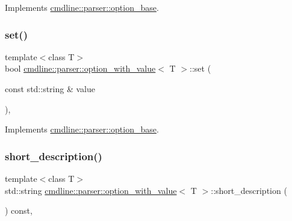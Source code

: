 Implements \mbox{\hyperlink{classcmdline_1_1parser_1_1option__base_a6729965a4221ba0112ca04f8550fce5c}{cmdline\+::parser\+::option\+\_\+base}}.

\mbox{\label{classcmdline_1_1parser_1_1option__with__value_a295815e19351f027fdbdcf00d46187d1}} 
\subsubsection{\texorpdfstring{set()}{set()}\hspace{0.1cm}{\footnotesize\ttfamily [2/2]}}
{\footnotesize\ttfamily template$<$class T$>$ \\
bool \mbox{\hyperlink{classcmdline_1_1parser_1_1option__with__value}{cmdline\+::parser\+::option\+\_\+with\+\_\+value}}$<$ T $>$\+::set (\begin{DoxyParamCaption}\item[{const std\+::string \&}]{value }\end{DoxyParamCaption})\hspace{0.3cm}{\ttfamily [inline]}, {\ttfamily [virtual]}}



Implements \mbox{\hyperlink{classcmdline_1_1parser_1_1option__base_a60444de6a257a3cca44a7a687a1d16fd}{cmdline\+::parser\+::option\+\_\+base}}.

\mbox{\label{classcmdline_1_1parser_1_1option__with__value_a7ea043466b20ee712439276b8ba888f3}} 
\subsubsection{\texorpdfstring{short\_description()}{short\_description()}}
{\footnotesize\ttfamily template$<$class T$>$ \\
std\+::string \mbox{\hyperlink{classcmdline_1_1parser_1_1option__with__value}{cmdline\+::parser\+::option\+\_\+with\+\_\+value}}$<$ T $>$\+::short\+\_\+description (\begin{DoxyParamCaption}{ }\end{DoxyParamCaption}) const\hspace{0.3cm}{\ttfamily [inline]}, {\ttfamily [virtual]}}



